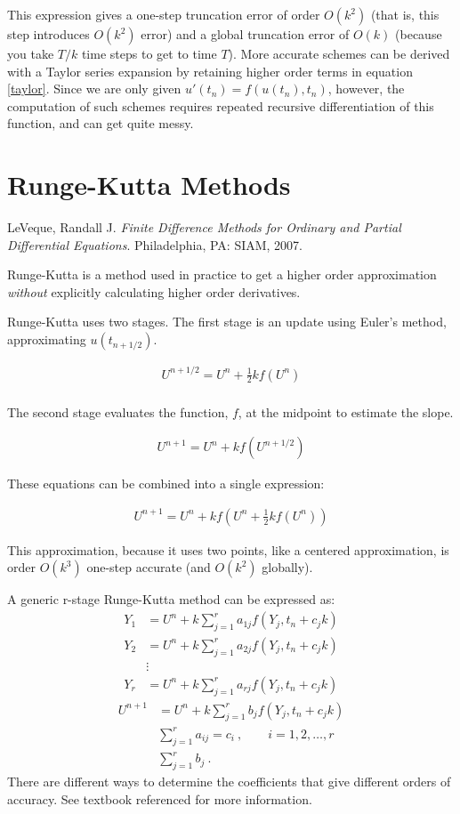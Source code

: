 \documentclass[12pt]{article}
\begin{document}
This expression gives a one-step truncation error of order $O(k^2)$ (that is, this step introduces $O(k^2)$ error) and a global truncation error of $O(k)$ (because you take $T/k$ time steps to get to time $T$). More 
accurate schemes can be derived with a Taylor series expansion by retaining 
higher order terms in equation \eqref{taylor}. Since we are only given 
$u'(t_n) = f(u(t_n),t_n)$, however, the computation of such schemes requires 
repeated recursive differentiation of this function, and can get quite messy.


\section{Runge-Kutta Methods}
LeVeque, Randall J. \textit{Finite Difference Methods for Ordinary and Partial Differential Equations}. Philadelphia, PA: SIAM, 2007. 

Runge-Kutta is a method used in practice to get a higher order approximation 
\emph{without} explicitly calculating higher order derivatives.

Runge-Kutta uses two stages. The first stage is an update using Euler's method, 
approximating $u(t_{n+1/2})$. 

\begin{align}
U^{n+1/2} = U^n + \frac{1}{2}kf(U^n)\\
\end{align}

The second stage evaluates the function, $f$, at the midpoint to estimate the 
slope.

\begin{align}
U^{n+1} = U^n + kf(U^{n+1/2})
\end{align}

These equations can be combined into a single expression:

\begin{align}
U^{n+1} = U^n + kf(U^n + \frac{1}{2}kf(U^n))
\end{align}

This approximation, because it uses two points, like a centered approximation, 
is order $O(k^3)$ one-step accurate (and $O(k^2)$ globally).

A generic r-stage Runge-Kutta method can be expressed as:
\begin{align}
Y_1 &= U^n + k\sum_{j=1}^r a_{1j}f(Y_j, t_n + c_jk)\\
Y_2 &= U^n + k\sum_{j=1}^r a_{2j}f(Y_j, t_n + c_jk)\\
&\vdots\nonumber\\
Y_r &= U^n + k\sum_{j=1}^r a_{rj}f(Y_j, t_n + c_jk)
\end{align}
\begin{align}
U^{n+1} &= U^n + k\sum_{j=1}^r b_{j}f(Y_j, t_n + c_jk)\\
&\sum_{j=1}^r a_{ij} = c_i\:, \qquad i = 1, 2, \dots, r \\
&\sum_{j=1}^r b_{j} \:.
\end{align}
There are different ways to determine the coefficients that give different orders of accuracy. See textbook referenced for more information.
\end{document}
